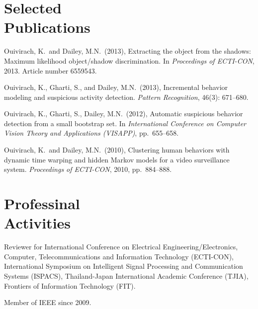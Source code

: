 \documentclass[margin, 10pt]{res}
\begin{document}
\begin{resume}
\section{Selected \\ Publications}

Ouivirach, K.\ and Dailey, M.N.\ (2013), Extracting the object from the shadows:
Maximum likelihood object/shadow discrimination. In {\it Proceedings of
ECTI-CON}, 2013. Article number 6559543.

Ouivirach, K., Gharti, S., and Dailey, M.N.\ (2013), Incremental behavior
modeling  and suspicious activity detection. {\it Pattern Recognition}, 46(3):
671--680.

Ouivirach, K., Gharti, S., Dailey, M.N.\ (2012), Automatic suspicious behavior
detection from a small bootstrap set. In {\it International Conference on
Computer Vision Theory and Applications (VISAPP)}, pp.\ 655--658.

Ouivirach, K.\ and Dailey, M.N.\ (2010), Clustering human behaviors with
dynamic time warping and hidden Markov models for a video surveillance system.
{\it Proceedings of ECTI-CON}, 2010, pp.\ 884--888.

\section{Professinal \\ Activities}

Reviewer for International Conference on Electrical Engineering/Electronics,
Computer, Telecommunications and Information Technology (ECTI-CON),
International Symposium on Intelligent Signal Processing and Communication
Systems (ISPACS), Thailand-Japan International Academic Conference (TJIA),
Frontiers of Information Technology (FIT).

Member of IEEE since 2009.

\end{resume}
\end{document}
